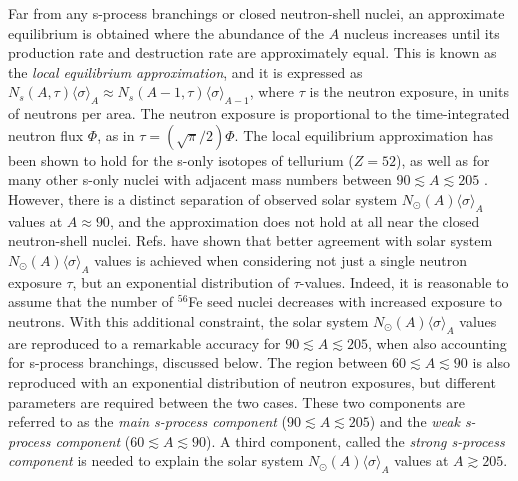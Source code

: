 Far from any s-process branchings or closed neutron-shell nuclei, an approximate equilibrium is obtained where the abundance of the $A$ nucleus increases until its production rate and destruction rate are approximately equal. This is known as the \emph{local equilibrium approximation}, and it is expressed as $N_{s}(A,\tau)\langle \sigma \rangle_{A} \approx N_{s}(A-1,\tau)\langle \sigma \rangle_{A-1}$, where $\tau$ is the neutron exposure, in units of neutrons per area. The neutron exposure is proportional to the time-integrated neutron flux $\Phi$, as in $\tau = (\sqrt{\pi}/2) \Phi$. The local equilibrium approximation has been shown to hold for the s-only isotopes of tellurium ($Z=52$), as well as for many other s-only nuclei with adjacent mass numbers between $90 \lesssim A \lesssim 205$ \cite{Iliadis2015}. However, there is a distinct separation of observed solar system $N_{\odot}(A)\langle \sigma \rangle_{A}$ values at $A \approx 90$, and the approximation does not hold at all near the closed neutron-shell nuclei. Refs. \cite{Clayton1961,Seeger1965} have shown that better agreement with solar system $N_{\odot}(A)\langle \sigma \rangle_{A}$ values is achieved when considering not just a single neutron exposure $\tau$, but an exponential distribution of $\tau$-values. Indeed, it is reasonable to assume that the number of $^{56}$Fe seed nuclei decreases with increased exposure to neutrons. With this additional constraint, the solar system $N_{\odot}(A)\langle \sigma \rangle_{A}$ values are reproduced to a remarkable accuracy for $90 \lesssim A \lesssim 205$, when also accounting for s-process branchings, discussed below. The region between $60 \lesssim A \lesssim 90$ is also reproduced with an exponential distribution of neutron exposures, but different parameters are required between the two cases. These two components are referred to as the \emph{main s-process component} ($90 \lesssim A \lesssim 205$) and the \emph{weak s-process component} ($60 \lesssim A \lesssim 90$). A third component, called the \emph{strong s-process component} is needed to explain the solar system $N_{\odot}(A)\langle \sigma \rangle_{A}$ values at $A \gtrsim 205$.



